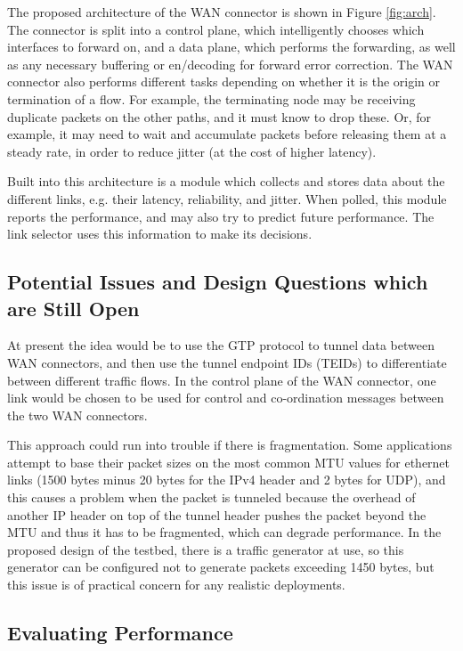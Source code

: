 The proposed architecture of the WAN connector is shown in Figure \ref{fig:arch}. The connector is split into a control plane, which intelligently chooses which interfaces to forward on, and a data plane, which performs the forwarding, as well as any necessary buffering or en/decoding for forward error correction. The WAN connector also performs different tasks depending on whether it is the origin or termination of a flow. For example, the terminating node may be receiving duplicate packets on the other paths, and it must know to drop these. Or, for example, it may need to wait and accumulate packets before releasing them at a steady rate, in order to reduce jitter (at the cost of higher latency).

Built into this architecture is a module which collects and stores data about the different links, e.g. their latency, reliability, and jitter. When polled, this module reports the performance, and may also try to predict future performance. The link selector uses this information to make its decisions.

\subsection{Potential Issues and Design Questions which are Still Open}

At present the idea would be to use the GTP protocol to tunnel data between WAN connectors, and then use the tunnel endpoint IDs (TEIDs) to differentiate between different traffic flows. In the control plane of the WAN connector, one link would be chosen to be used for control and co-ordination messages between the two WAN connectors.

This approach could run into trouble if there is fragmentation. Some applications attempt to base their packet sizes on the most common MTU values for ethernet links (1500 bytes  minus 20 bytes for the IPv4 header and 2 bytes for UDP), and this causes a problem when the packet is tunneled because the overhead of another IP header on top of the tunnel header pushes the packet beyond the MTU and thus it has to be fragmented, which can degrade performance. In the proposed design of the testbed, there is a traffic generator at use, so this generator can be configured not to generate packets exceeding 1450 bytes, but this issue is of practical concern for any realistic deployments.

\subsection{Evaluating Performance}


